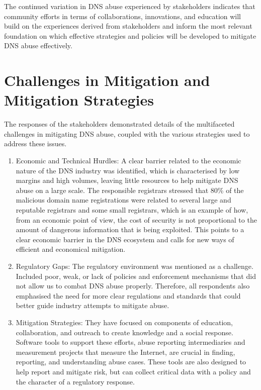 The continued variation in DNS abuse experienced by stakeholders indicates that community efforts in terms of collaborations, innovations, and education will build on the experiences derived from stakeholders and inform the most relevant foundation on which effective strategies and policies will be developed to mitigate DNS abuse effectively.

\section{Challenges in Mitigation and Mitigation Strategies} 

The responses of the stakeholders demonstrated details of the multifaceted challenges in mitigating DNS abuse, coupled with the various strategies used to address these issues.
\begin{enumerate}
    \item Economic and Technical Hurdles: A clear barrier related to the economic nature of the DNS industry was identified, which is characterised by low margins and high volumes, leaving little resources to help mitigate DNS abuse on a large scale. The responsible registrars stressed that 80\% of the malicious domain name registrations were related to several large and reputable registrars and some small registrars, which is an example of how, from an economic point of view, the cost of security is not proportional to the amount of dangerous information that is being exploited. This points to a clear economic barrier in the DNS ecosystem and calls for new ways of efficient and economical mitigation.
    \item Regulatory Gaps: The regulatory environment was mentioned as a challenge. Included poor, weak, or lack of policies and enforcement mechanisms that did not allow us to combat DNS abuse properly. Therefore, all respondents also emphasised the need for more clear regulations and standards that could better guide industry attempts to mitigate abuse.
    \item Mitigation Strategies: They have focused on components of education, collaboration, and outreach to create knowledge and a social response. Software tools to support these efforts, abuse reporting intermediaries and measurement projects that measure the Internet, are crucial in finding, reporting, and understanding abuse cases. These tools are also designed to help report and mitigate risk, but can collect critical data with a policy and the character of a regulatory response.
    
    
\end{enumerate}


